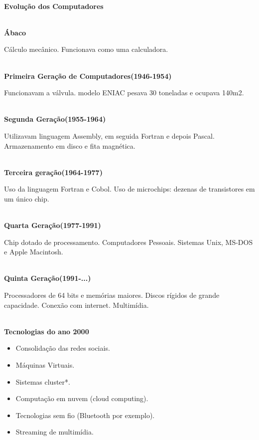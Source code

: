 \documentclass[12pt, a4paper]{article}
\begin{document}
\noindent
\textbf{\\Evolução dos Computadores}


\textbf{\\Ábaco}

Cálculo mecânico. Funcionava como uma calculadora.


\textbf{\\Primeira Geração de Computadores(1946-1954)}

Funcionavam a válvula. modelo ENIAC pesava 30 toneladas e ocupava 140m2.


\textbf{\\Segunda Geração(1955-1964)}

Utilizavam linguagem Assembly, em seguida Fortran e depois Pascal.
Armazenamento em disco e fita magnética.

\newpage
\vspace*{0.5cm}

\textbf{\\Terceira geração(1964-1977)}

Uso da linguagem Fortran e Cobol.
Uso de microchips: dezenas de transistores em um único chip.


\textbf{\\Quarta Geração(1977-1991)}

Chip dotado de processamento. Computadores Pessoais.
Sistemas Unix, MS-DOS e Apple Macintosh.


\textbf{\\Quinta Geração(1991-...)}

Processadores de 64 bits e memórias maiores. Discos rígidos de grande capacidade.
Conexão com internet. Multimídia.


\textbf{\\Tecnologias do ano 2000}

\begin{itemize}
    \item Consolidação das redes sociais.
    \item Máquinas Virtuais.
    \item Sistemas cluster*.
    \item Computação em nuvem (cloud computing).
    \item Tecnologias sem fio (Bluetooth por exemplo).
    \item Streaming de multimídia.
\end{itemize}
\end{document}
